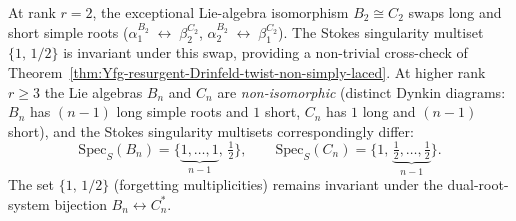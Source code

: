 \begin{remark}[\texorpdfstring{$B_2 \cong C_2$}{B-2 = C-2} exceptional cross-check]
\label{rem:Yfg-resurgent-B2-C2-iso}
At rank $r = 2$, the exceptional Lie-algebra isomorphism
$B_2 \cong C_2$ swaps long and short simple roots
\textup{(}$\alpha_1^{B_2}\;\leftrightarrow\;\beta_2^{C_2}$,
$\alpha_2^{B_2}\;\leftrightarrow\;\beta_1^{C_2}$\textup{).}
The Stokes singularity multiset $\{1,\, 1/2\}$ is invariant under this
swap, providing a non-trivial cross-check of
Theorem~\ref{thm:Yfg-resurgent-Drinfeld-twist-non-simply-laced}.
At higher rank $r \ge 3$ the Lie algebras $B_n$ and $C_n$ are
\emph{non-isomorphic} \textup{(}distinct Dynkin diagrams: $B_n$ has
$(n-1)$ long simple roots and $1$ short, $C_n$ has $1$ long and
$(n-1)$ short\textup{),} and the Stokes singularity multisets
correspondingly differ:
\[
 \mathrm{Spec}_S(B_n) = \{\underbrace{1, \dots, 1}_{n-1},\, \tfrac{1}{2}\},
 \qquad
 \mathrm{Spec}_S(C_n) = \{1,\, \underbrace{\tfrac{1}{2}, \dots, \tfrac{1}{2}}_{n-1}\}.
\]
The set $\{1,\, 1/2\}$ \textup{(}forgetting multiplicities\textup{)}
remains invariant under the dual-root-system bijection
$B_n \leftrightarrow C_n^*$.
\end{remark}

